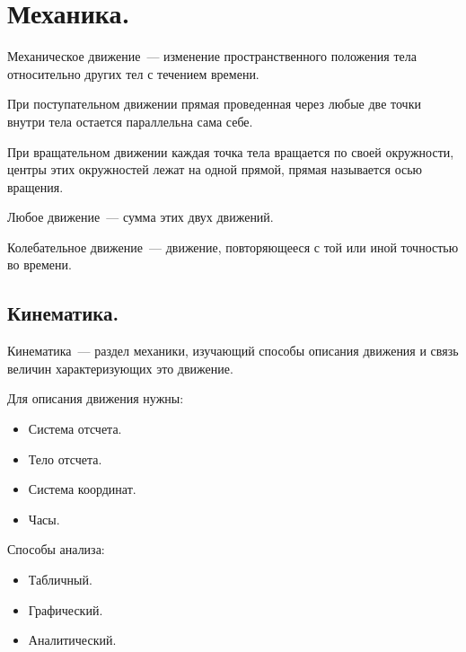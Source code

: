 \documentclass{article}
\begin{document}
	\tableofcontents
	\setcounter{tocdepth}{3}
	\newpage
	\section{Механика.}
	\begin{definition}
		Механическое движение~--- изменение пространственного положения тела относительно других тел с течением времени.
	\end{definition}
	\begin{definition}
		При поступательном движении прямая проведенная через любые две точки внутри тела остается параллельна сама себе.
	\end{definition}
	\begin{definition}
		При вращательном движении каждая точка тела вращается по своей окружности, центры этих окружностей лежат на одной прямой, прямая называется осью вращения.
	\end{definition}
	\begin{statement}
		Любое движение~--- сумма этих двух движений.
	\end{statement}
	\begin{definition}
		Колебательное движение~--- движение, повторяющееся с той или иной точностью во времени.
	\end{definition}
	\subsection{Кинематика.}
	\begin{definition}
		Кинематика~--- раздел механики, изучающий способы описания движения и связь величин характеризующих это движение.
	\end{definition}
	\begin{statement}
		Для описания движения нужны:
		\begin{itemize}
			\item Система отсчета.
			\item Тело отсчета.
			\item Система координат.
			\item Часы.
		\end{itemize}
	\end{statement}
	\begin{statement}
		Способы анализа:
		\begin{itemize}
			\item Табличный.
			\item Графический.
			\item Аналитический.
		\end{itemize}
	\end{statement}
\end{document}
